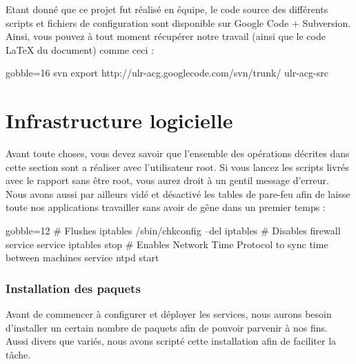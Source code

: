 \documentclass[11pt,a4paper]{report}
\begin{document}
            
            Etant donné que ce projet fut réalisé en équipe, le code source des différents scripts et fichiers de configuration sont disponible sur Google Code + Subversion. Ainsi, vous pouvez à tout moment récupérer notre travail (ainsi que le code {\LaTeX} du document) comme ceci :\\
            
            \begin{bashcode*}{gobble=16}
                svn export http://ulr-acg.googlecode.com/svn/trunk/ ulr-acg-src
            \end{bashcode*}
            
    \part{Infrastructure logicielle}
        
        Avant toute choses, vous devez savoir que l'ensemble des opérations décrites dans cette section sont a réaliser avec l'utilisateur root. Si vous lancez les scripts livrés avec le rapport sans être root, vous aurez droit à un gentil message d'erreur.\\
        
        Nous avons aussi par ailleurs vidé et désactivé les tables de pare-feu afin de laisse toute nos applications travailler sans avoir de gêne dans un premier temps :\\
        
        \begin{bashcode*}{gobble=12}
            # Flushes iptables
            /sbin/chkconfig --del iptables
            # Disables firewall service
            service iptables stop
            # Enables Network Time Protocol to sync time between machines
            service ntpd start
        \end{bashcode*}
        
        \section{Installation des paquets}
            
            Avant de commencer à configurer et déployer les services, nous aurons besoin d'installer un certain nombre de paquets afin de pouvoir parvenir à nos fins. Aussi divers que variés, nous avons scripté cette installation afin de faciliter la tâche.\\
            
\end{document}
